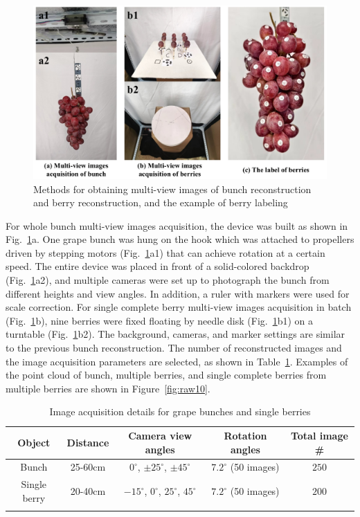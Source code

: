\documentclass[12pt]{article}
\begin{document}
\begin{figure}[hbt!]
    \centering
    \includegraphics[width=1\textwidth]{figures/Figure3.pdf}
    \caption{Methods for obtaining multi-view images of bunch reconstruction and berry reconstruction, and the example of berry labeling}
    \label{fig:raw9}
\end{figure}

For whole bunch multi-view images acquisition, the device was built as shown in Fig.~\ref{fig:raw9}a. 
One grape bunch was hung on the hook which was attached to propellers driven by stepping motors (Fig.~\ref{fig:raw9}a1) that can achieve rotation at a certain speed. 
The entire device was placed in front of a solid-colored backdrop (Fig.~\ref{fig:raw9}a2), and multiple cameras were set up to photograph the bunch from different heights and view angles. 
In addition, a ruler with markers were used for scale correction. 
For single complete berry multi-view images acquisition in batch (Fig.~\ref{fig:raw9}b), 
nine berries were fixed floating by needle disk (Fig.~\ref{fig:raw9}b1) on a turntable (Fig.~\ref{fig:raw9}b2). 
The background, cameras, and marker settings are similar to the previous bunch reconstruction. 
The number of reconstructed images and the image acquisition parameters are selected, as shown in Table~\ref{tbl:2}. 
Examples of the point cloud of bunch, multiple berries, and single complete berries from multiple berries are shown in Figure~\ref{fig:raw10}.

\begin{table}[h]
    \centering
    \caption{Image acquisition details for grape bunches and single berries}
    \begin{tabular}{ccccc}
        \hline
        \textbf{Object} & \textbf{Distance} & \textbf{Camera view angles} & \textbf{Rotation angles} &  \textbf{Total image \#} \\
        \hline
        Bunch        & 25-60cm & $0^{\circ}$, $\pm 25^{\circ}$, $\pm 45^{\circ}$ & $7.2^{\circ}$ (50 images) & $250$ \\
        Single berry & 20-40cm & $-15^{\circ}$, $0^{\circ}$, $25^{\circ}$, $45^{\circ}$ & $7.2^{\circ}$ (50 images) & $200$ \\
        \hline
    \label{tbl:2}
    \end{tabular}
\end{table}
\end{document}
